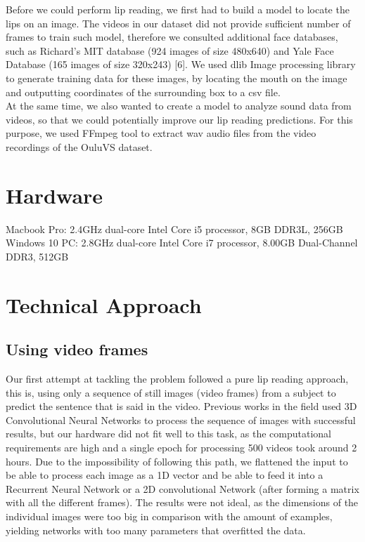 \documentclass{article}[10pt]
\begin{document}
\begin{multicols}{2}
Before we could perform lip reading, we first had to build a model to locate the
lips on an image. The videos in our dataset did not provide sufficient number of
frames to train such model, therefore we consulted additional face databases, such
as Richard's MIT database (924 images of size 480x640) and Yale Face Database
(165 images of size 320x243) [6]. We used dlib Image processing library to
generate training data for these images, by locating the mouth on the image and
outputting coordinates of the surrounding box to a csv file.\\

At the same time, we also wanted to create a model to analyze sound data from
videos, so that we could potentially improve our lip reading predictions. For
this purpose, we used FFmpeg tool to extract wav audio files from the video
recordings of the OuluVS dataset.

\section{Hardware}
Macbook Pro: 2.4GHz dual-core Intel Core i5 processor, 8GB DDR3L, 256GB\\
Windows 10 PC: 2.8GHz dual-core Intel Core i7 processor, 8.00GB Dual-Channel DDR3, 512GB

\section{Technical Approach}
\subsection{Using video frames}

Our first attempt at tackling the problem followed a pure lip reading approach,
this is, using only a sequence of still images (video frames) from a subject to
predict the sentence that is said in the video. Previous works in the field used
3D Convolutional Neural Networks to process the sequence of images with
successful results, but our hardware did not fit well to this task, as the
computational requirements are high and a single epoch for
processing 500 videos took around 2 hours. Due to the impossibility of following this path, we
flattened the input to be able to process each image as a 1D vector and be able
to feed it into a Recurrent Neural Network or a 2D convolutional Network
(after forming a matrix with all the different frames). The results were not
ideal, as the dimensions of the individual images were too big in comparison with
the amount of examples, yielding networks with too many parameters that
overfitted the data.


\end{multicols}
\end{document}
